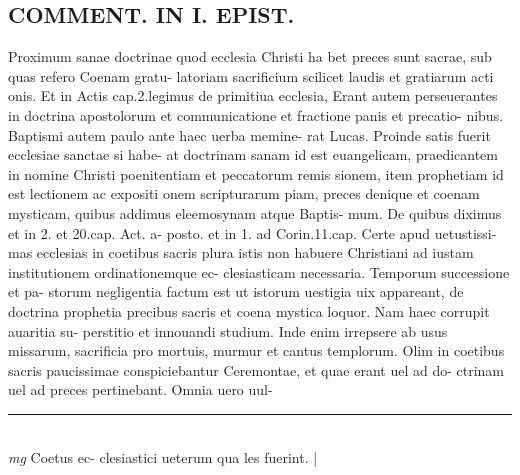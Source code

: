 \documentclass{article}
\begin{document}
\begin{pages}
\section*{COMMENT. IN I. EPIST. }\pstart Proximum sanae doctrinae quod ecclesia Christi ha bet preces sunt sacrae, sub quas refero Coenam gratu- latoriam sacrificium scilicet laudis et gratiarum acti onis. Et in Actis cap.2.legimus de primitiua ecclesia, Erant autem perseuerantes in doctrina apostolorum et communicatione et fractione panis et precatio- nibus. Baptismi autem paulo ante haec uerba memine- rat Lucas. Proinde satis fuerit ecclesiae sanctae si habe- at doctrinam sanam id est euangelicam, praedicantem in nomine Christi poenitentiam et peccatorum remis sionem, item prophetiam id est lectionem ac expositi onem scripturarum piam, preces denique et coenam mysticam, quibus addimus eleemosynam atque Baptis- mum. De quibus diximus et in 2. et 20.cap. Act. a- posto. et in 1. ad Corin.11.cap. Certe apud uetustissi- mas ecclesias in coetibus sacris plura istis non habuere Christiani ad iustam institutionem ordinationemque ec- clesiasticam necessaria. Temporum successione et pa- storum negligentia factum est ut istorum uestigia uix appareant, de doctrina prophetia precibus sacris et coena mystica loquor. Nam haec corrupit auaritia su- perstitio et innouandi studium. Inde enim irrepsere ab usus missarum, sacrificia pro mortuis, murmur et cantus templorum. Olim in coetibus sacris paucissimae conspiciebantur Ceremontae, et quae erant uel ad do- ctrinam uel ad preces pertinebant. Omnia uero uul-  \pend
\vspace{0.5cm}\noindent
\vspace{0.2cm}\rule{5cm}{0.2pt}\\ 
\textit{mg}
\footnotesize Coetus ec- clesiastici ueterum qua les fuerint. 
\normalsize| 

\end{pages}
\end{document}
